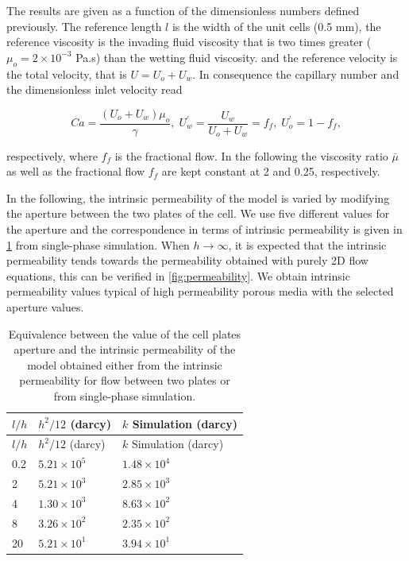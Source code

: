 \documentclass[]{article}
\begin{document}
The results are given as a function of the dimensionless numbers defined
previously. The reference length \(l\) is the width of the unit cells
(0.5 mm), the reference viscosity is the invading fluid viscosity that
is two times greater (\(\mu_o=2\times 10^{-3}\) Pa.s) than the wetting
fluid viscosity. and the reference velocity is the total velocity, that
is \(U=U_{o}+U_{w}\). In consequence the capillary number and the
dimensionless inlet velocity read

\[
Ca=\frac{(U_{o}+U_{w})\mu_{o}}{\gamma},\;U_{w}^{'}=\frac{U_{w}}{U_{o}+U_{w}}=f_{f},\;U_{o}^{'}=1-f_{f},
\]

respectively, where \(f_{f}\) is the fractional flow. In the following
the viscosity ratio \(\bar{\mu}\) as well as the fractional flow
\(f_{f}\) are kept constant at 2 and 0.25, respectively.

In the following, the intrinsic permeability of the model is varied by
modifying the aperture between the two plates of the cell. We use five
different values for the aperture and the correspondence in terms of
intrinsic permeability is given in \cref{tbl:permeability} from
single-phase simulation. When \(h\rightarrow\infty\), it is expected
that the intrinsic permeability tends towards the permeability obtained
with purely 2D flow equations, this can be verified in
\cref{fig:permeability}. We obtain intrinsic permeability values typical
of high permeability porous media with the selected aperture values.

\begin{longtable}[]{@{}lll@{}}
\caption{Equivalence between the value of the cell plates aperture and
the intrinsic permeability of the model obtained either from the
intrinsic permeability for flow between two plates or from single-phase
simulation. \label{tbl:permeability}}\tabularnewline
\toprule
\(l/h\) & \(h^2/12\) (darcy) & \(k\) Simulation (darcy)\tabularnewline
\midrule
\endfirsthead
\toprule
\(l/h\) & \(h^2/12\) (darcy) & \(k\) Simulation (darcy)\tabularnewline
\midrule
\endhead
0.2 & \(5.21 \times 10^{5}\) & \(1.48 \times 10^{4}\)\tabularnewline
2 & \(5.21 \times 10^{3}\) & \(2.85 \times 10^{3}\)\tabularnewline
4 & \(1.30 \times 10^{3}\) & \(8.63 \times 10^{2}\)\tabularnewline
8 & \(3.26 \times 10^{2}\) & \(2.35 \times 10^{2}\)\tabularnewline
20 & \(5.21 \times 10^{1}\) & \(3.94 \times 10^{1}\)\tabularnewline
\bottomrule
\end{longtable}
\end{document}
